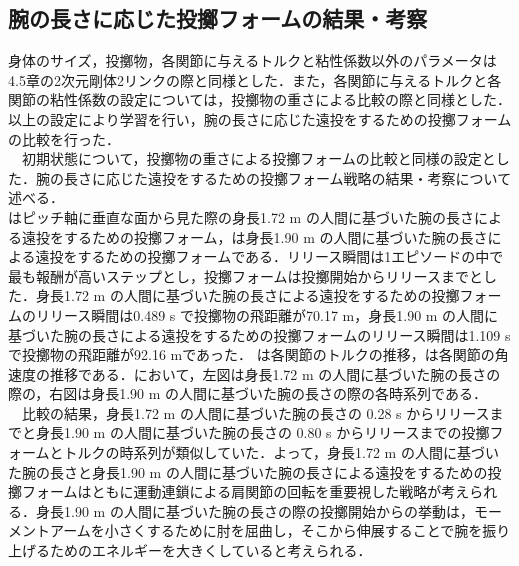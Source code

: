 \begin{small}
\subsection{腕の長さに応じた投擲フォームの結果・考察}
身体のサイズ，投擲物，各関節に与えるトルクと粘性係数以外のパラメータは4.5章の2次元剛体2リンクの際と同様とした．また，各関節に与えるトルクと各関節の粘性係数の設定については，投擲物の重さによる比較の際と同様とした．
以上の設定により学習を行い，腕の長さに応じた遠投をするための投擲フォームの比較を行った．\\
　初期状態について，投擲物の重さによる投擲フォームの比較と同様の設定とした．腕の長さに応じた遠投をするための投擲フォーム戦略の結果・考察について述べる．\\
はピッチ軸に垂直な面から見た際の身長1.72 m の人間に基づいた腕の長さによる遠投をするための投擲フォーム，は身長1.90 m の人間に基づいた腕の長さによる遠投をするための投擲フォームである．リリース瞬間は1エピソードの中で最も報酬が高いステップとし，投擲フォームは投擲開始からリリースまでとした．身長1.72 m の人間に基づいた腕の長さによる遠投をするための投擲フォームのリリース瞬間は0.489 s で投擲物の飛距離が70.17 m，身長1.90 m の人間に基づいた腕の長さによる遠投をするための投擲フォームのリリース瞬間は1.109 s で投擲物の飛距離が92.16 mであった．
は各関節のトルクの推移，は各関節の角速度の推移である．において，左図は身長1.72 m の人間に基づいた腕の長さの際の，右図は身長1.90 m の人間に基づいた腕の長さの際の各時系列である．\\
　比較の結果，身長1.72 m の人間に基づいた腕の長さの 0.28 s からリリースまでと身長1.90 m の人間に基づいた腕の長さの 0.80 s からリリースまでの投擲フォームとトルクの時系列が類似していた．よって，身長1.72 m の人間に基づいた腕の長さと身長1.90 m の人間に基づいた腕の長さによる遠投をするための投擲フォームはともに運動連鎖による肩関節の回転を重要視した戦略が考えられる．身長1.90 m の人間に基づいた腕の長さの際の投擲開始からの挙動は，モーメントアームを小さくするために肘を屈曲し，そこから伸展することで腕を振り上げるためのエネルギーを大きくしていると考えられる．

\end{small}

